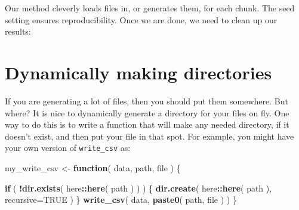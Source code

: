 \documentclass[
]{book}
\newenvironment{Shaded}{\begin{snugshade}}{\end{snugshade}}
\newcommand{\AttributeTok}[1]{\textcolor[rgb]{0.13,0.29,0.53}{#1}}
\newcommand{\CommentTok}[1]{\textcolor[rgb]{0.56,0.35,0.01}{\textit{#1}}}
\newcommand{\ConstantTok}[1]{\textcolor[rgb]{0.56,0.35,0.01}{#1}}
\newcommand{\ControlFlowTok}[1]{\textcolor[rgb]{0.13,0.29,0.53}{\textbf{#1}}}
\newcommand{\DecValTok}[1]{\textcolor[rgb]{0.00,0.00,0.81}{#1}}
\newcommand{\FunctionTok}[1]{\textcolor[rgb]{0.13,0.29,0.53}{\textbf{#1}}}
\newcommand{\NormalTok}[1]{#1}
\newcommand{\OtherTok}[1]{\textcolor[rgb]{0.56,0.35,0.01}{#1}}
\newcommand{\SpecialCharTok}[1]{\textcolor[rgb]{0.81,0.36,0.00}{\textbf{#1}}}
\newcommand{\StringTok}[1]{\textcolor[rgb]{0.31,0.60,0.02}{#1}}
\begin{document}
Our method cleverly loads files in, or generates them, for each chunk.
The seed setting ensures reproducibility.
Once we are done, we need to clean up our results:

\begin{Shaded}
\end{Shaded}

\section{Dynamically making directories}\label{dynamically-making-directories}

If you are generating a lot of files, then you should put them somewhere.
But where?
It is nice to dynamically generate a directory for your files on fly.
One way to do this is to write a function that will make any needed directory, if it doesn't exist, and then put your file in that spot.
For example, you might have your own version of \texttt{write\_csv} as:

\begin{Shaded}
\begin{Highlighting}[]
\NormalTok{my\_write\_csv }\OtherTok{\textless{}{-}} \ControlFlowTok{function}\NormalTok{( data, path, file ) \{}
  
  \ControlFlowTok{if}\NormalTok{ ( }\SpecialCharTok{!}\FunctionTok{dir.exists}\NormalTok{( here}\SpecialCharTok{::}\FunctionTok{here}\NormalTok{( path ) ) ) \{}
    \FunctionTok{dir.create}\NormalTok{( here}\SpecialCharTok{::}\FunctionTok{here}\NormalTok{( path ), }\AttributeTok{recursive=}\ConstantTok{TRUE}\NormalTok{ ) }
\NormalTok{  \}}
  \FunctionTok{write\_csv}\NormalTok{( data, }\FunctionTok{paste0}\NormalTok{( path, file ) )}
\NormalTok{\}}
\end{Highlighting}
\end{Shaded}
\end{document}
